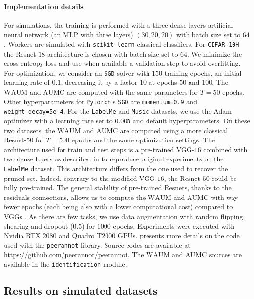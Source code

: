 \paragraph*{Implementation details}
For simulations, the training is performed with a three dense layers artificial neural network (an MLP with three layers) $(30, 20, 20)$ with batch size set to $64$.
Workers are simulated with \texttt{scikit-learn} \citep{scikit-learn} classical classifiers.
For \texttt{CIFAR-10H} the Resnet-$18$ \citep{he2016deep} architecture is chosen with batch size set to $64$.
We minimize the cross-entropy loss and use when available a validation step to avoid overfitting.
For optimization, we consider an \texttt{SGD} solver with $150$ training epochs, an initial learning rate of $0.1$, decreasing it by a factor $10$ at epochs $50$ and $100$.
The $\mathrm{WAUM}$ and $\mathrm{AUMC}$ are computed with the same parameters for $T=50$ epochs.
Other hyperparameters for \texttt{Pytorch}'s \citep{pytorch} \texttt{SGD} are \texttt{momentum=0.9} and \texttt{weight\_decay=5e-4}.
For the \texttt{LabelMe} and \texttt{Music} datasets, we use the Adam optimizer with a learning rate set to $0.005$ and default hyperparameters.
On these two datasets, the $\mathrm{WAUM}$ and $\mathrm{AUMC}$ are computed using a more classical Resnet-50 for $T=500$ epochs and the same optimization settings.
The architecture used for train and test steps is a pre-trained VGG-$16$ combined with two dense layers as described in \citet{rodrigues2018deep} to reproduce original experiments on the \texttt{LabelMe} dataset.
This architecture differs from the one used to recover the pruned set.
Indeed, contrary to the modified VGG-$16$, the Resnet-$50$ could be fully pre-trained.
The general stability of pre-trained Resnets, thanks to the residuals connections, allows us to compute the $\mathrm{WAUM}$ and $\mathrm{AUMC}$ with way fewer epochs (each being also with a lower computational cost) compared to VGGs \citep{he2016deep}.
As there are few tasks, we use data augmentation with random flipping, shearing and dropout ($0.5$) for $1000$ epochs.
Experiments were executed with Nvidia RTX 2080 and Quadro T2000 GPUs.
 presents more details on the code used with the \texttt{peerannot} library.
Source codes are available at \url{https://github.com/peerannot/peerannot}. The $\mathrm{WAUM}$ and $\mathrm{AUMC}$ sources are available in the \texttt{identification} module.

\subsection{Results on simulated datasets}
\label{subsec:Synthetic_dataset}

